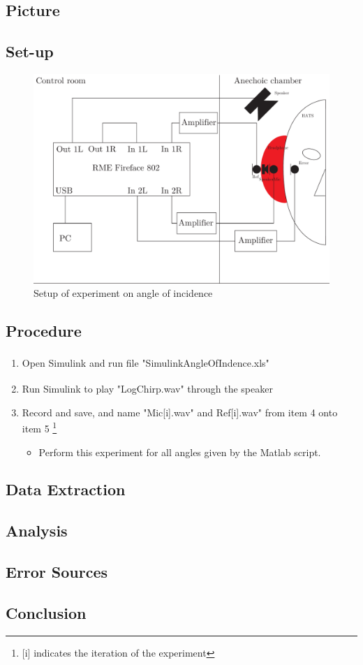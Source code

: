 \subsection{Picture}

\subsection{Set-up}
\begin{figure}[H]
	\includegraphics[width=\textwidth]{../Journal/Experiments/AngleOfIncidence/AngleOfIncidenceSetup.pdf}
	\caption{Setup of experiment on angle of incidence}
	\label{Fig:AngleOfIncidenceSetup}
\end{figure}

\subsection{Procedure}
\begin{enumerate}
	\item Open Simulink\textsuperscript{\textregistered} and run file "SimulinkAngleOfIndence.xls"
	\item Run Simulink\textsuperscript{\textregistered} to play "LogChirp.wav" through the speaker
	\item Record and save, and name "Mic[i].wav" and Ref[i].wav" from item 4 onto item 5 \footnote{[i] indicates the iteration of the experiment}
	\begin{itemize}
		\item[] Perform this experiment for all angles given by the Matlab script. 
	\end{itemize}
\end{enumerate}

\subsection{Data Extraction}

\subsection{Analysis}

\subsection{Error Sources}

\subsection{Conclusion}